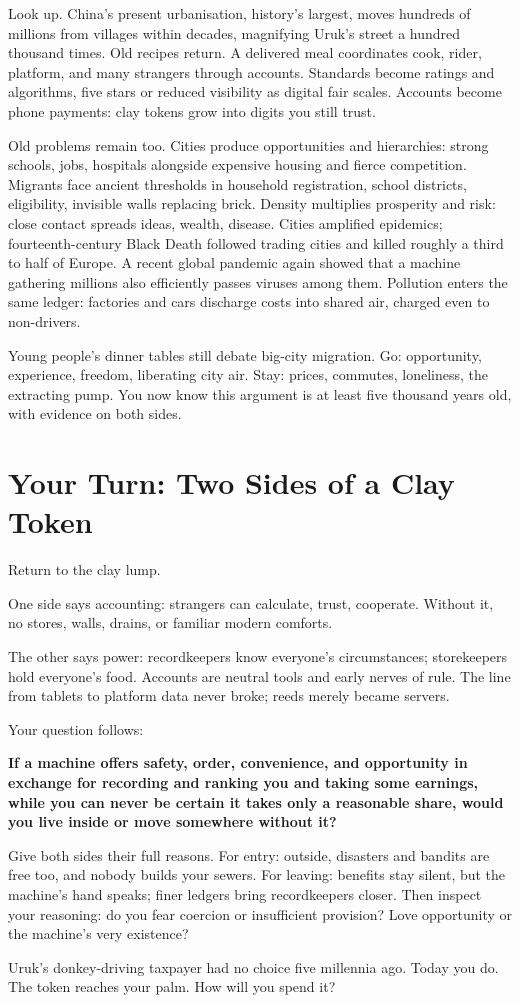 Look up. China's present urbanisation, history's largest, moves hundreds of millions from villages within decades, magnifying Uruk's street a hundred thousand times. Old recipes return. A delivered meal coordinates cook, rider, platform, and many strangers through accounts. Standards become ratings and algorithms, five stars or reduced visibility as digital fair scales. Accounts become phone payments: clay tokens grow into digits you still trust.

Old problems remain too. Cities produce opportunities and hierarchies: strong schools, jobs, hospitals alongside expensive housing and fierce competition. Migrants face ancient thresholds in household registration, school districts, eligibility, invisible walls replacing brick. Density multiplies prosperity and risk: close contact spreads ideas, wealth, disease. Cities amplified epidemics; fourteenth-century Black Death followed trading cities and killed roughly a third to half of Europe. A recent global pandemic again showed that a machine gathering millions also efficiently passes viruses among them. Pollution enters the same ledger: factories and cars discharge costs into shared air, charged even to non-drivers.

Young people's dinner tables still debate big-city migration. Go: opportunity, experience, freedom, liberating city air. Stay: prices, commutes, loneliness, the extracting pump. You now know this argument is at least five thousand years old, with evidence on both sides.

\section{Your Turn: Two Sides of a Clay Token}
Return to the clay lump.

One side says accounting: strangers can calculate, trust, cooperate. Without it, no stores, walls, drains, or familiar modern comforts.

The other says power: recordkeepers know everyone's circumstances; storekeepers hold everyone's food. Accounts are neutral tools and early nerves of rule. The line from tablets to platform data never broke; reeds merely became servers.

Your question follows:

\textbf{If a machine offers safety, order, convenience, and opportunity in exchange for recording and ranking you and taking some earnings, while you can never be certain it takes only a reasonable share, would you live inside or move somewhere without it?}

Give both sides their full reasons. For entry: outside, disasters and bandits are free too, and nobody builds your sewers. For leaving: benefits stay silent, but the machine's hand speaks; finer ledgers bring recordkeepers closer. Then inspect your reasoning: do you fear coercion or insufficient provision? Love opportunity or the machine's very existence?

Uruk's donkey-driving taxpayer had no choice five millennia ago. Today you do. The token reaches your palm. How will you spend it?
